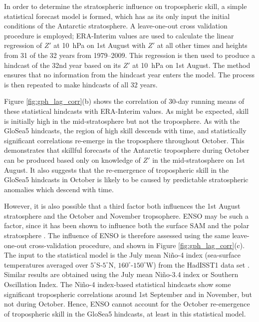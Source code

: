 In order to determine the stratospheric influence on tropospheric skill, a
simple statistical forecast model is formed, which has as its only input the
initial conditions of the Antarctic stratosphere. A leave-one-out cross
validation procedure is employed; ERA-Interim values are used to calculate the
linear regression of $Z'$ at 10~hPa on 1st August with $Z'$ at all other times
and heights from 31 of the 32 years from 1979--2009. This regression is then
used to produce a hindcast of the 32nd year based on its $Z'$ at 10~hPa on 1st
August. The method ensures that no information from the hindcast year enters the
model. The process is then repeated to make hindcasts of all 32 years.

Figure \ref{fig:gph_lag_corr}(b) shows the correlation of 30-day running means
of these statistical hindcasts with ERA-Interim values. As might be expected,
skill is initially high in the mid-stratosphere but not the troposphere. As with
the GloSea5 hindcasts, the region of high skill descends with time, and
statistically significant correlations re-emerge in the troposphere throughout
October. This demonstrates that skillful forecasts of the Antarctic troposphere
during October can be produced based only on knowledge of $Z'$ in the
mid-stratosphere on 1st August. It also suggests that the re-emergence of
tropospheric skill in the GloSea5 hindcasts in October is likely to be caused by
predictable stratospheric anomalies which descend with time.

However, it is also possible that a third factor both influences the 1st August
stratosphere and the October and November tropsophere. ENSO may be such a
factor, since it has been shown to influence both the surface SAM
\citep{Lim2013} and the polar stratosphere \citep{Hurwitz2011}. The influence of
ENSO is therefore assessed using the same leave-one-out cross-validation
procedure, and shown in Figure \ref{fig:gph_lag_corr}(c). The input to the
statistical model is the July mean Ni\~no-4 index (sea-surface temperatures
averaged over $5^{\circ}$S-$5^{\circ}$N, $160^{\circ}$-$150^{\circ}$W) from the
HadISST1 data set \citep{Rayner2003}. Similar results are obtained using the
July mean Ni\~no-3.4 index or Southern Oscillation Index. The Ni\~no-4
index-based statistical hindcasts show some significant tropospheric
correlations around 1st September and in November, but not during
October. Hence, ENSO cannot account for the October re-emergence of tropospheric
skill in the GloSea5 hindcasts, at least in this statistical model.

